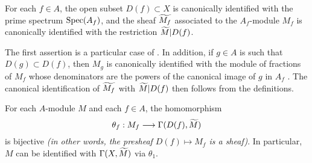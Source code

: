 \begin{prop}[1.3.6]
\label{1.1.3.6}
For each $f\in A$, the open subset $D(f)\subset X$ is canonically identified with the prime spectrum ${\mathop{\mathrm{Spec}}\nolimits}(A_f)$, and the sheaf ${\widetilde{M_f}}$ associated to the $A_f$-module $M_f$ is canonically identified with the restriction ${\widetilde{M}}|D(f)$.
\end{prop}

The first assertion is a particular case of .
In addition, if $g\in A$ is such that $D(g)\subset D(f)$, then $M_g$ is canonically identified with the module of fractions of $M_f$ whose denominators are the powers of the canonical image of $g$ in $A_f$ .
The canonical identification of ${\widetilde{M_f}}$ with ${\widetilde{M}}|D(f)$ then follows from the definitions.

\begin{thm}[1.3.7]
\label{1.1.3.7}
For each $A$-module $M$ and each $f\in A$, the homomorphism
\[
  \theta_f:M_f\to\Gamma(D(f),\wt{M})
\]
is bijective \emph{(in other words, the presheaf $D(f)\mapsto M_f$ is a \emph{sheaf})}.
In particular, $M$ can be identified with $\Gamma(X,{\widetilde{M}})$ via $\theta_1$.
\end{thm}

